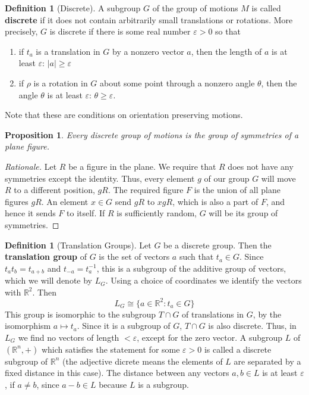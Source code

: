 \documentclass[12pt]{article}
\newtheorem{prop}[thm]{Proposition}
\theoremstyle{definition}
\newtheorem{defn}[thm]{Definition}
\theoremstyle{remark}
\numberwithin{equation}{section}
\newcommand\R{\mathbb R}    %
\newcommand\B[1]{\textbf{ #1}}
\begin{document}
\begin{defn}[Discrete]
        A subgroup $G$ of the group of motions $M$ is called \B{discrete} if it does not contain arbitrarily small translations or rotations. More precisely, $G$ is discrete if there is some real number $\varepsilon > 0$ so that \begin{enumerate}
                \item if $t_a$ is a translation in $G$ by a nonzero vector $a$, then the length of $a$ is at least $\varepsilon$: $|a| \geq \varepsilon$
                \item if $\rho$ is a rotation in $G$ about some point through a nonzero angle $\theta$, then the angle $\theta$ is at least $\varepsilon$: $\theta \geq \varepsilon$.
        \end{enumerate}
        Note that these are conditions on orientation preserving motions.
\end{defn}


\vspace{15pt}


\begin{prop}
        Every discrete group of motions is the group of symmetries of a plane figure.
\end{prop}
\begin{proof}
        [Rationale] Let $R$ be a figure in the plane. We require that $R$ does not have any symmetries except the identity. Thus, every element $g$ of our group $G$ will move $R$ to a different position, $gR$. The required figure $F$ is the union of all plane figures $gR$. An element $x \in G$ send $gR$ to $xgR$, which is also a part of $F$, and hence it sends $F$ to itself. If $R$ is sufficiently random, $G$ will be its group of symmetries.
\end{proof}

\vspace{15pt}

\begin{defn}[Translation Groups]
        Let $G$ be a discrete group. Then the \B{translation group} of $G$ is the set of vectors $a$ such that $t_a \in G$. Since $t_at_b = t_{a+b}$ and $t_{-a} = t_a^{-1}$, this is a subgroup of the additive group of vectors, which we will denote by $L_G$. Using a choice of coordinates we identify the vectors with $\R^2$. Then \begin{equation}
                L_G \cong \{a \in \R^2:t_a \in G\}
        \end{equation}
        This group is isomorphic to the subgroup $T \cap G$ of translations in $G$, by the isomorphism $a \mapsto t_a$. Since it is a subgroup of $G$, $T\cap G$ is also discrete. Thus, in $L_G$ we find no vectors of length $<\varepsilon$, except for the zero vector. A subgroup $L$ of $(\R^n,+)$ which satisfies the statement for some $\varepsilon > 0$ is called a discrete subgroup of $\R^n$ (the adjective dicrete means the elements of $L$ are separated by a fixed distance in this case). The distance between any vectors $a,b\in L$ is at least $\varepsilon$, if $a \neq b$, since $a-b \in L$ because $L$ is a subgroup.
\end{defn}
\end{document}
